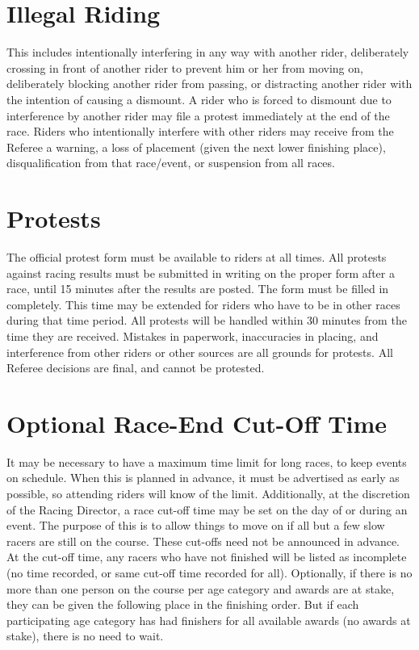 \section{Illegal Riding}
This includes intentionally interfering in any way with another rider, deliberately crossing in front of another rider to prevent him or her from moving on, deliberately blocking another rider from passing, or distracting another rider with the intention of causing a dismount.
A rider who is forced to dismount due to interference by another rider may file a protest immediately at the end of the race.
Riders who intentionally interfere with other riders may receive from the Referee a warning, a loss of placement (given the next lower finishing place), disqualification from that race/event, or suspension from all races.

\section{Protests}
The official protest form must be available to riders at all times.
All protests against racing results must be submitted in writing on the proper form after a race, until 15 minutes after the results are posted.
The form must be filled in completely.
This time may be extended for riders who have to be in other races during that time period.
All protests will be handled within 30 minutes from the time they are received.
Mistakes in paperwork, inaccuracies in placing, and interference from other riders or other sources are all grounds for protests.
All Referee decisions are final, and cannot be protested.

\section{Optional Race-End Cut-Off Time}
It may be necessary to have a maximum time limit for long races, to keep events on schedule.
When this is planned in advance, it must be advertised as early as possible, so attending riders will know of the limit.
Additionally, at the discretion of the Racing Director, a race cut-off time may be set on the day of or during an event.
The purpose of this is to allow things to move on if all but a few slow racers are still on the course.
These cut-offs need not be announced in advance.
At the cut-off time, any racers who have not finished will be listed as incomplete (no time recorded, or same cut-off time recorded for all).
Optionally, if there is no more than one person on the course per age category and awards are at stake, they can be given the following place in the finishing order.
But if each participating age category has had finishers for all available awards (no awards at stake), there is no need to wait.

